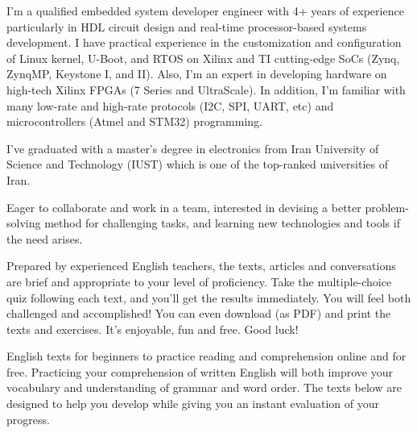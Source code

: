 \documentclass[11pt, a4paper]{awesome-cv} %
\begin{document}
\makecvheader[R] %

\makelettertitle[R] %


\begin{cvletter}



I'm a qualified embedded system developer engineer with 4+ years of experience particularly in HDL circuit design and real-time processor-based systems development. I have practical experience in the customization and configuration of Linux kernel, U-Boot, and RTOS on Xilinx and TI cutting-edge SoCs (Zynq, ZynqMP, Keystone I, and II). Also, I'm an expert in developing hardware on high-tech Xilinx FPGAs (7 Series and UltraScale). In addition, I'm familiar with many low-rate and high-rate protocols (I2C, SPI, UART, etc) and microcontrollers (Atmel and STM32) programming.

I've graduated with a master's degree in electronics from Iran University of Science and Technology (IUST) which is one of the top-ranked universities of Iran.

Eager to collaborate and work in a team, interested in devising a better problem-solving method for challenging tasks, and learning new technologies and tools if the need arises.



Prepared by experienced English teachers, the texts, articles and conversations are brief and appropriate to your level of proficiency. Take the multiple-choice quiz following each text, and you'll get the results immediately. You will feel both challenged and accomplished! You can even download (as PDF) and print the texts and exercises. It's enjoyable, fun and free. Good luck!



English texts for beginners to practice reading and comprehension online and for free. Practicing your comprehension of written English will both improve your vocabulary and understanding of grammar and word order. The texts below are designed to help you develop while giving you an instant evaluation of your progress.


\end{cvletter}
\end{document}
